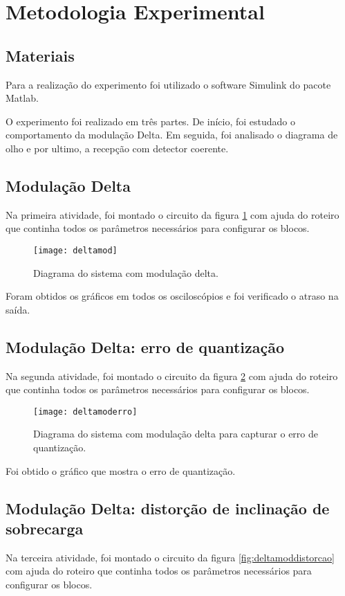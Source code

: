\newpage
\section{Metodologia Experimental}

\subsection{Materiais}

Para a realização do experimento foi utilizado o software Simulink do pacote Matlab.

O experimento foi realizado em três partes. De início, foi estudado o comportamento da modulação Delta. Em seguida, foi analisado o diagrama de olho e por ultimo, a recepção com detector coerente.

\subsection{Modulação Delta}
Na primeira atividade, foi montado o circuito da figura \ref{fig:deltamod} com ajuda do roteiro que continha todos os parâmetros necessários para configurar os blocos.

\begin{figure}[H]
    \centering
    \texttt{[image: deltamod]}
    \caption{Diagrama do sistema com modulação delta.}
    \label{fig:deltamod}
\end{figure}

Foram obtidos os gráficos em todos os osciloscópios e foi verificado o atraso na saída.

\subsection{Modulação Delta: erro de quantização}
Na segunda atividade, foi montado o circuito da figura \ref{fig:deltamoderro} com ajuda do roteiro que continha todos os parâmetros necessários para configurar os blocos.

\begin{figure}[H]
    \centering
    \texttt{[image: deltamoderro]}
    \caption{Diagrama do sistema com modulação delta para capturar o erro de quantização.}
    \label{fig:deltamoderro}
\end{figure}

Foi obtido o gráfico que mostra o erro de quantização.


\subsection{Modulação Delta: distorção de inclinação de sobrecarga}
Na terceira atividade, foi montado o circuito da figura \ref{fig:deltamoddistorcao} com ajuda do roteiro que continha todos os parâmetros necessários para configurar os blocos.

